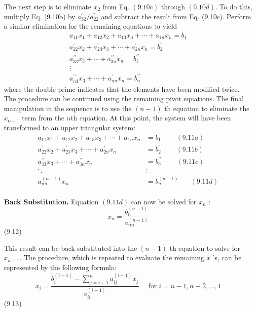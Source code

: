 \documentclass[../main.tex]{subfiles}
\begin{document}
The next step is to eliminate $x_{2}$ from Eq. $(9.10 c)$ through $(9.10 d)$. To do this, multiply Eq. (9.10b) by $a_{32}^{\prime} / a_{22}^{\prime}$ and subtract the result from Eq. (9.10c). Perform a similar elimination for the remaining equations to yield
$$
\begin{array}{r}
a_{11} x_{1}+a_{12} x_{2}+a_{13} x_{3}+\cdots+a_{1 n} x_{n}=b_{1} \\
a_{22}^{\prime} x_{2}+a_{23}^{\prime} x_{3}+\cdots+a_{2 n}^{\prime} x_{n}=b_{2}^{\prime} \\
a_{33}^{\prime \prime} x_{3}+\cdots+a_{3 n}^{\prime \prime} x_{n}=b_{3}^{\prime \prime} \\
\vdots \\
a_{n 3}^{\prime \prime} x_{3}+\cdots+a_{n n}^{\prime} x_{n}=b_{n}^{\prime \prime}
\end{array}
$$
where the double prime indicates that the elements have been modified twice.
The procedure can be continued using the remaining pivot equations. The final manipulation in the sequence is to use the $(n-1)$ th equation to eliminate the $x_{n-1}$ term from the $n$th equation. At this point, the system will have been transformed to an upper triangular system:
$$
\begin{aligned}
a_{11} x_{1}+a_{12} x_{2}+a_{13} x_{3}+\cdots+a_{1 n} x_{n} &=b_{1} \ \ \ \ \ \ \ \ \ \ (9.11a)\\
a_{22}^{\prime} x_{2}+a_{23}^{\prime} x_{3}+\cdots+a_{2 n}^{\prime} x_{n} &=b_{2}^{\prime} \ \ \ \ \ \ \ \ \ \ (9.11b)\\
a_{33}^{\prime \prime} x_{3}+\cdots+a_{3 n}^{\prime \prime} x_{n} &=b_{3}^{\prime \prime} \ \ \ \ \ \ \ \ \ \ (9.11c)\\
\ddots & \vdots \\
a_{n n}^{(n-1)} x_{n} &=b_{n}^{(n-1)} \ \ \ \ \ \ \ \  (9.11d)\\
\end{aligned}
$$

\noindent \textbf{Back Substitution.} Equation $(9.11 d)$ can now be solved for $x_{n}$ :
$$
x_{n}=\frac{b_{n}^{(n-1)}}{a_{n n}^{(n-1)}}
$$\hfill{(9.12)}

This result can be back-substituted into the $(n-1)$ th equation to solve for $x_{n-1}$. The procedure, which is repeated to evaluate the remaining $x$ 's, can be represented by the following formula:
$$
x_{i}=\frac{b_{i}^{(i-1)}-\sum_{j=i+1}^{n} a_{i j}^{(i-1)} x_{j}}{a_{i i}^{(i-1)}} \quad \text { for } i=n-1, n-2, \ldots, 1
$$\hfill{(9.13)}
\end{document}
